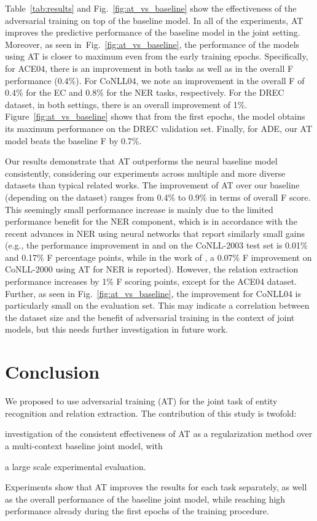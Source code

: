 \documentclass[11pt,a4paper]{article}
\newcommand{\eg}{e.g., }
\newcommand{\figref}[1]{Fig.~\ref{#1}}    \newcommand{\Figref}[1]{Figure~\ref{#1}}  \newcommand{\tabref}[1]{Table~\ref{#1}}
\begin{document}
\tabref{tab:results} and \figref{fig:at_vs_baseline} show the effectiveness of the adversarial training on top of the baseline model. In all of the experiments, AT improves the predictive performance of the baseline model in the joint setting. Moreover, as seen in~\figref{fig:at_vs_baseline}, the performance of the models using AT is closer to maximum even from the early training epochs. Specifically, for ACE04, there is an improvement in both tasks as well as in the overall F performance (0.4\%). For CoNLL04, we note an improvement in the overall F of 0.4\% for the EC and 0.8\% for the NER tasks, respectively. 
For the DREC dataset, in both settings, there is an overall improvement of 1\%. \Figref{fig:at_vs_baseline} shows that from the first epochs, the model obtains its maximum performance on the DREC validation set. Finally, for ADE, our AT model beats the baseline F by 0.7\%.

Our results demonstrate that AT outperforms the neural baseline model consistently, 
considering our experiments across multiple and more diverse datasets than typical related works.
The improvement of AT over our baseline (depending on the dataset) ranges from 0.4\% to 0.9\% in
terms of overall F score.
This seemingly small performance increase is mainly due to the limited performance benefit for the NER component, which is in accordance with the recent advances in NER using neural networks that report similarly small gains
(\eg the performance improvement
in  and  on the CoNLL-2003 test set is 0.01\% and 0.17\% F
percentage points, while in the work of , a 0.07\% F improvement on CoNLL-2000 using AT for NER is reported).
However, the relation extraction performance increases by 1\% F scoring points, except for the
ACE04 dataset.
Further, as seen in \figref{fig:at_vs_baseline}, the improvement for CoNLL04 is particularly small on the evaluation set. This may indicate a correlation between the
dataset size and the benefit of adversarial training in the context of joint models, but this needs further
investigation in future work.

\section{Conclusion}
We proposed to use adversarial training (AT) for the joint task of entity recognition and relation extraction. The contribution of this study is twofold:
\begin{enumerate*}[label=(\roman*)]
\item investigation of the consistent effectiveness of AT as a regularization method over a multi-context baseline joint model, with 
\item a large scale experimental evaluation.
\end{enumerate*}
Experiments show that AT improves the results for each task separately, as well as the overall performance of the baseline joint model, while reaching high performance already during the first epochs of the training procedure. 
\end{document}
